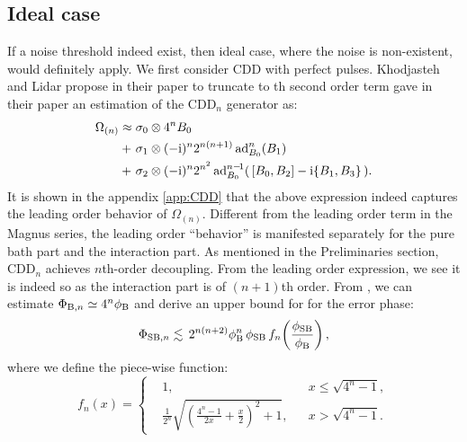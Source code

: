 \documentclass[pra,reprint,superscriptaddress]{revtex4-2}
\newcommand{\CDDn}{\mathrm{CDD}_n}
\begin{document}
\subsection{Ideal case}
If a noise threshold indeed exist, then ideal case, where the noise is non-existent, would definitely apply. 
We first consider CDD with perfect pulses. Khodjasteh and Lidar propose in their paper to truncate to th second order term
gave in their paper an estimation of the $\CDDn$ generator as:
\begin{align}\label{eq:cdd-generator-est}
\Omega_{(n)} 
\approx {} & \sigma_0 \otimes 4^n B_0 \notag \\
+\ & \sigma_1 \otimes (-\mathrm{i})^{n} 2^{n(n+1)} \operatorname{ad}_{B_0}^{n}(B_1)\\ 
+\ & \sigma_2 \otimes (-\mathrm{i})^{n} 2^{n^2} \operatorname{ad}_{B_0}^{n-\!1}( \,[B_0,B_2] - \mathrm{i} \{B_1,B_3\} \,). \notag
\end{align} 
It is shown in the appendix \ref{app:CDD} that the above expression indeed captures the leading order behavior of $\Omega_{(n)}$. Different from the leading order term in the Magnus series, the leading order ``behavior'' is manifested separately for the pure bath part and the interaction part.  As mentioned in the Preliminaries section, $\CDDn$ achieves $n$th-order decoupling.  From the leading order expression, we see it is indeed so as the interaction part is of $(n+1)$th order.
From , we can 
estimate $\Phi_{\mathrm{B},n} \simeq 4^n\phi_{\mathrm{B}}$ and derive an upper bound for for the error phase:
\begin{equation}
\Phi_{\mathrm{SB},n} \lesssim \,
2^{n(n+2)} \phi_{\mathrm{B}}^{n}\,\phi_{\mathrm{SB}} \,f_n\!\left(\frac{\phi_{\mathrm{SB}}}{\phi_{\mathrm{B}}}\right),
\end{equation}
where we define the piece-wise function:
\begin{equation}
 f_n(x) =\left\{
 \begin{aligned}
 &1, && x \le  \sqrt{4^n-1}, \\
 &\frac{1}{2^n} \sqrt{\left(\frac{4^n-1}{2x}+\frac{x}{2}\right)^2+1}, &&
 x > \sqrt{4^n-1}.
 \end{aligned}
 \right.
\end{equation}
\end{document}
